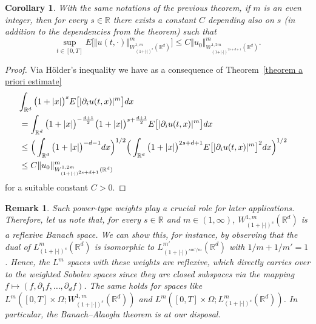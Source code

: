 \documentclass[a4paper,10pt]{article}
\newtheorem{corollary}[theorem]{Corollary}
\newtheorem{remark}[theorem]{Remark}
\newcommand\1{\mathbbm{1}}
\numberwithin{equation}{section}
\begin{document}
\begin{corollary}
\label{Corollary a priori estimate}With the same notations of the previous
theorem, if $m$ is an even integer, then for every $s\in\mathbb{R}$ there exists a
constant $C$ depending also on $s$ \textup{(}in addition to the dependencies from the theorem\textup{)}
such that
\begin{equation*}
\sup_{t\in [0,T]}E \Big[ \Vert u(t,\cdot)\Vert_{W_{(1+\vert \cdot \vert)^{s}}^{1,m}(
\mathbb{R}^{d})}^{m} \Big] \leq C \Vert u_{0} \Vert_{W_{(1+\vert \cdot \vert)^{2s+d+1}}^{1,2m}(\mathbb{R}^{d})}^{m}.
\end{equation*}
\end{corollary}

\begin{proof}
Via H\"older's inequality we have as a consequence of Theorem~\ref{theorem a priori estimate}
\begin{align*}
\lefteqn{ \int_{\mathbb{R}^{d}} \big(1+\vert x \vert \big)^{s} E\big[ \vert \partial_{i} u(t,x) \vert^{m}\big] dx } \\
& =\int_{\mathbb{R}^{d}} \big(1+\vert x \vert \big)^{-\frac{d+1}{2}} \big(1+\vert x\vert \big)^{s+\frac{d+1}{2}} E\big[ \vert \partial_{i}u(t,x) \vert^{m}\big]  dx \\
&  \leq \Big( \int_{\mathbb{R}^{d}} \big(1+\vert x \vert \big)^{-d-1}dx \Big)^{1/2} \Big( \int_{\mathbb{R}^{d}} \big(1+ \vert x \vert \big)^{2s+ d+1} E\big[ \vert \partial_{i}u(t,x) \vert^{m} \big]^{2} dx \Big)^{1/2} \\
&  \leq C \Vert u_{0} \Vert_{W_{(1+\vert \cdot \vert )^{2s+d+1}}^{1,2m}(\mathbb{R}^{d})}^{m}
\end{align*}
for a suitable constant $C>0$.
\end{proof}

\begin{remark}
\label{rem_weihted_spaces_reflexive}
Such power-type weights play a crucial role for later applications. Therefore, let us note that, for every $s \in \mathbb{R}$ and $m \in (1,\infty)$, $W^{1,m}_{(1+|\cdot|)^s}(\mathbb{R}^d)$ is a reflexive Banach space. We can show this, for instance, by observing that the dual of $L^m_{(1+|\cdot|)^s}(\mathbb{R}^d)$ is isomorphic to $L^{m'}_{(1+|\cdot|)^{sm'/m}}(\mathbb{R}^d)$ with $1/m + 1/m' = 1$. Hence, the $L^m$ spaces with these weights are reflexive, which directly carries over to the weighted Sobolev spaces since they are closed subspaces via the mapping $f\mapsto(f,\partial_1f,\ldots,\partial_df)$. The same holds for spaces like $L^m([0,T]\times\Omega;W^{1,m}_{(1+|\cdot|)^s}(\mathbb{R}^d))$ and $L^m([0,T]\times\Omega;L^m_{(1+|\cdot|)^s}(\mathbb{R}^d))$. In particular, the Banach--Alaoglu theorem is at our disposal.
\end{remark}
\end{document}
